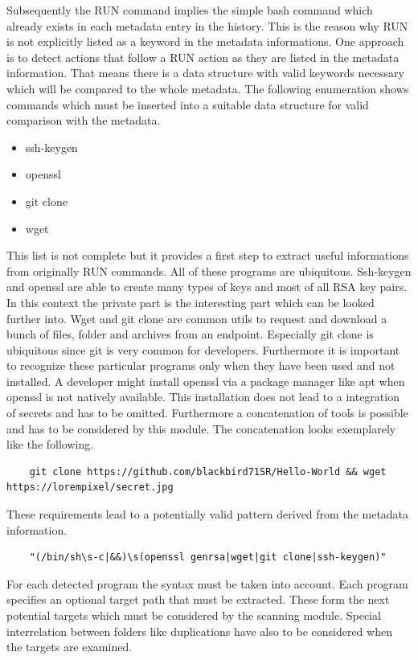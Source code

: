 Subsequently the RUN command implies the simple bash command which already exists in each metadata entry in the history. 
This is the reason why RUN is not explicitly listed as a keyword in the metadata informations. 
One approach is to detect actions that follow a RUN action as they are listed in the metadata information. 
That means there is a data structure with valid keywords necessary which will be compared to the whole metadata.
The following enumeration shows commands which must be inserted into a suitable data structure for valid comparison with the metadata.
\begin{itemize}
\item ssh-keygen
\item openssl
\item git clone
\item wget
\end{itemize}
This list is not complete but it provides a first step to extract useful informations from originally RUN commands. 
All of these programs are ubiquitous.
Ssh-keygen and openssl are able to create many types of keys and most of all RSA key pairs. 
In this context the private part is the interesting part which can be looked further into.
Wget and git clone are common utils to request and download a bunch of files, folder and archives from an endpoint. 
Especially git clone is ubiquitous since git is very common for developers.
Furthermore it is important to recognize these particular programs only when they have been used and not installed.
A developer might install openssl via a package manager like apt when openssl is not natively available.
This installation does not lead to a integration of secrets and has to be omitted.
Furthermore a concatenation of tools is possible and has to be considered by this module. 
The concatenation looks exemplarely like the following.
\begin{lstlisting}
	git clone https://github.com/blackbird71SR/Hello-World && wget https://lorempixel/secret.jpg
\end{lstlisting}

These requirements lead to a potentially valid pattern derived from the metadata information.
\begin{lstlisting}
	"(/bin/sh\s-c|&&)\s(openssl genrsa|wget|git clone|ssh-keygen)"
\end{lstlisting}

For each detected program the syntax must be taken into account. 
Each program specifies an optional target path that must be extracted. 
These form the next potential targets which must be considered by the scanning module. 
Special interrelation between folders like duplications have also to be considered when the targets are examined.

